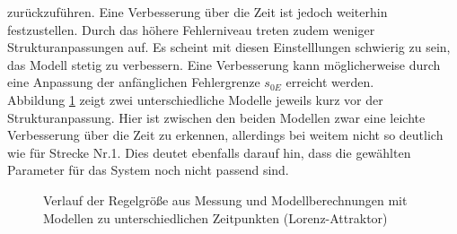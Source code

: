                 zurückzuführen. Eine Verbesserung über die Zeit ist jedoch weiterhin festzustellen. Durch das höhere Fehlerniveau treten zudem weniger Strukturanpassungen auf. 
                Es scheint mit diesen Einstelllungen schwierig zu sein, das Modell stetig zu verbessern. Eine Verbesserung kann möglicherweise durch eine Anpassung der anfänglichen 
                Fehlergrenze $s_{0E}$ erreicht werden.\\
                Abbildung \ref{Abb:Modelle201} zeigt zwei unterschiedliche Modelle jeweils kurz vor der Strukturanpassung. 
                Hier ist zwischen den beiden Modellen zwar eine leichte Verbesserung über die Zeit zu erkennen, allerdings bei weitem nicht so deutlich wie für Strecke Nr.1.
                Dies deutet ebenfalls darauf hin, dass die gewählten Parameter für das System noch nicht passend sind.  
                \begin{figure}[H]
                    \caption{Verlauf der Regelgröße aus Messung und Modellberechnungen mit Modellen zu unterschiedlichen Zeitpunkten (Lorenz-Attraktor)}
                    \label{Abb:Modelle201}
                \end{figure}

